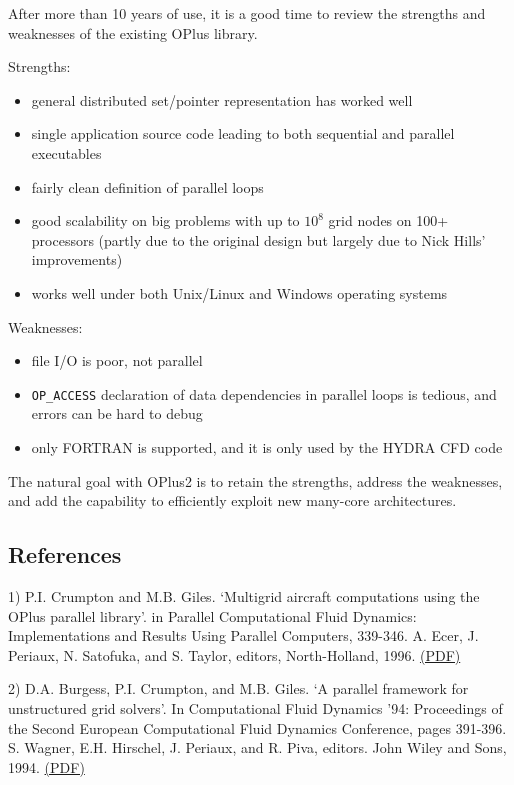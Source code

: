 \documentclass[12pt]{article}
\begin{document}
After more than 10 years of use, it is a good time to review the 
strengths and weaknesses of the existing OPlus library.

Strengths:
\begin{itemize}
\item
general distributed set/pointer representation has worked well
\item
single application source code leading to both sequential and 
parallel executables
\item
fairly clean definition of parallel loops
\item
good scalability on big problems with up to $10^8$ grid nodes
on 100+ processors (partly due to the original design 
but largely due to Nick Hills' improvements)
\item
works well under both Unix/Linux and Windows operating systems
\end{itemize}

Weaknesses:
\begin{itemize}
\item
file I/O is poor, not parallel
\item
{\tt OP\_ACCESS} declaration of data dependencies in parallel 
loops is tedious, and errors can be hard to debug
\item
only FORTRAN is supported, and it is only used by the HYDRA CFD code
\end{itemize}


The natural goal with OPlus2 is to retain the strengths, address the 
weaknesses, and add the capability to efficiently exploit new many-core 
architectures.

\subsection*{References}

1) P.I. Crumpton and M.B. Giles. `Multigrid aircraft computations using 
the OPlus parallel library'. in  Parallel Computational Fluid Dynamics: 
Implementations and Results Using Parallel Computers, 339-346. A. Ecer, 
J. Periaux, N. Satofuka, and S. Taylor, editors, North-Holland, 1996.  
\href{http://people.maths.ox.ac.uk/~gilesm/files/para_cfd95.pdf}{(PDF)}

2) D.A. Burgess, P.I. Crumpton, and M.B. Giles. `A parallel framework 
for unstructured grid solvers'. In Computational Fluid Dynamics '94: 
Proceedings of the Second European Computational Fluid Dynamics 
Conference, pages 391-396. S. Wagner, E.H. Hirschel, J. Periaux, and 
R. Piva, editors. John Wiley and Sons, 1994.  
\href{http://people.maths.ox.ac.uk/~gilesm/files/NA-95-20.pdf}{(PDF)}
\end{document}
